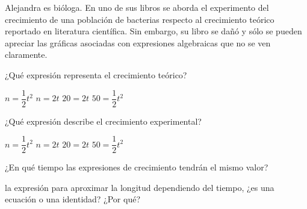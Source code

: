 \begin{minipage}[t][][t]{0.6\textwidth}
    Alejandra es bióloga. En uno de sus libros se aborda el experimento del crecimiento de una población de bacterias
    respecto al crecimiento teórico reportado en literatura científica. Sin embargo, su libro se dañó y sólo se pueden apreciar
    las gráficas asociadas con expresiones algebraicas que no se ven claramente.

    \begin{parts}
        ¿Qué expresión representa el crecimiento teórico?

        \begin{oneparchoices}
            \choice $n=\dfrac{1}{2}t^2$
            \choice $n=2t$
            \choice $20=2t$
            \choice $50=\dfrac{1}{2}t^2$
        \end{oneparchoices}

        ¿Qué expresión describe el crecimiento experimental?

        \begin{oneparchoices}
            \choice $n=\dfrac{1}{2}t^2$
            \choice $n=2t$
            \choice $20=2t$
            \choice $50=\dfrac{1}{2}t^2$
        \end{oneparchoices}

        ¿En qué tiempo las expresiones de crecimiento tendrán el mismo valor?

        \begin{solutionbox}{1.2cm}

        \end{solutionbox}

        la expresión para aproximar la longitud dependiendo del tiempo, ¿es una ecuación o una identidad? ¿Por qué?

        \begin{solutionbox}{1.2cm}

        \end{solutionbox}

    \end{parts}
\end{minipage}\hfill
